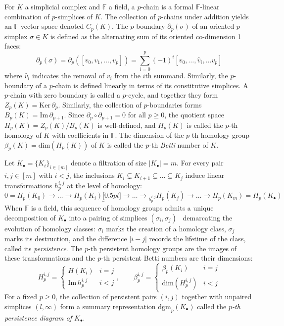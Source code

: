 \documentclass[10pt]{article}
\begin{document}
For $K$ a simplicial complex and $\mathbb{F}$ a field, a $p$-chain is a formal $\mathbb{F}$-linear combination of $p$-simplices of $K$. The collection of $p$-chains under addition yields an $\mathbb{F}$-vector space denoted $C_p(K)$. 
The $p$-boundary $\partial_p(\sigma)$ of an oriented $p$-simplex $\sigma\in K$ is defined as the alternating sum of its oriented co-dimension 1 faces:
\begin{equation}\label{eq:alt_sum}
	\partial_p(\sigma) = \partial_p([v_0, v_1, \dots, v_p]) = \sum_{i=0}^p (-1)^i [v_0, \dots, \hat{v}_i, \dots v_p]
\end{equation}
where $\hat{v}_i$ indicates the removal of $v_i$ from the $i$th summand. Similarly, the $p$-boundary of a $p$-chain is defined linearly in terms of its constitutive simplices. 
A $p$-chain with zero boundary is called a $p$-cycle, and together they form $Z_p(K) = \mathrm{Ker}\,\partial_p$. Similarly, the collection of $p$-boundaries forms  $B_p(K) = \mathrm{Im}\,\partial_{p+1}$. Since $\partial_p \circ \partial_{p+1} = 0$ for all $p\geq 0$, the quotient space $H_p(K) = Z_p(K) / B_{p}(K)$ is well-defined, and $H_p(K)$ is called the $p$-th homology of $K$ with coefficients in $\mathbb{F}$. The dimension of the $p$-th homology group $\beta_p(K) = \mathrm{dim}(H_p(K))$ of $K$ is called the $p$-th \emph{Betti} number of $K$. 

Let $K_\bullet = \{K_i\}_{i\in [m]}$ denote a filtration of size $\lvert K_\bullet \rvert = m$. For every pair $i,j \in [m]$ with $i < j$, the inclusions $K_i \subsetneq K_{i+1} \subsetneq \dots \subsetneq K_j$ induce linear transformations $h_p^{i,j}$  at the level of homology:
\begin{equation}\label{eq:hom_map}
	0 = H_p(K_0) \to \dots \to H_p(K_i) \underbracket[0.5pt]{\to \dots \to}_{h_p^{i,j}} H_p(K_j) \to \dots \to H_p(K_m) = H_p(K_\bullet) 
\end{equation}
When $\mathbb{F}$ is a field, this sequence of homology groups admits a unique decomposition of $K_\bullet$ into a pairing of simplices $(\sigma_i, \sigma_j)$~\cite{} demarcating the evolution of homology classes: $\sigma_i$ marks the creation of a homology class, $\sigma_j$ marks its destruction, and the difference $\lvert i - j \rvert$ records the lifetime of the class, called its \emph{persistence}.
The $p$-th persistent homology groups are the images of these transformations and the $p$-th persistent Betti numbers are their dimensions:
\begin{equation}
	H_{p}^{i,j} = \begin{cases}
	H(K_i) & i = j \\ 
 	\mathrm{Im}\,h_p^{i,j} & i < j
 \end{cases}
, \quad \quad 
\beta_p^{i,j} = \begin{cases}
 	\beta_p(K_i) & i = j \\
 	\mathrm{dim}(H_{p}^{i,j}) & i < j
 \end{cases}
\end{equation}
For a fixed $p \geq 0$, the collection of persistent pairs $(i, j)$ together with unpaired simplices $(l, \infty)$ form a summary representation $\mathrm{dgm}_p(K_\bullet)$ called the \emph{$p$-th persistence diagram of $K_\bullet$}.
\end{document}
